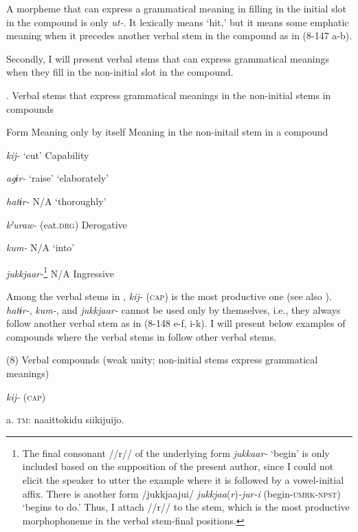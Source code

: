 A morpheme that can express a grammatical meaning in filling in the initial slot in the compound is only \textit{ut-}. It lexically means ‘hit,’ but it means some emphatic meaning when it precedes another verbal stem in the compound as in (8-147 a-b).

  Secondly, I will present verbal stems that can express grammatical meanings when they fill in the non-initial slot in the compound.

\begin{styleBeschriftung}
\textmd{}\textmd{. Verbal stems that express grammatical meanings in the non-initial stems in} \textmd{compounds}
\end{styleBeschriftung}

Form    Meaning only by itself    Meaning in the non-initail stem in a compound

\textit{kij-}    ‘cut’    Capability

\textit{agɨr-}    ‘raise’    ‘elaborately’

\textit{hatɨr-}    N/A    ‘thoroughly’

\textit{kˀuraw-}    (eat.\textsc{drg})    Derogative

\textit{kum-}    N/A    ‘into’

\textit{jukkjaar-}\footnote{The final consonant //r// of the underlying form \textit{jukkaar-} ‘begin’ is only included based on the supposition of the present author, since I could not elicit the speaker to utter the example where it is followed by a vowel-initial affix. There is another form /jukkjaajui/ \textit{jukkjaa}(\textit{r})\textit{{}-jur-i} (begin-\textsc{umrk}-\textsc{npst}) ‘begins to do.’ Thus, I attach //r// to the stem, which is the most productive morphophoneme in the verbal stem-final positions.}    N/A    Ingressive

Among the verbal stems in , \textit{kij-} (\textsc{cap}) is the most productive one (see also ). \textit{hatɨr-}, \textit{kum-}, and \textit{jukkjaar-} cannot be used only by themselves, i.e., they always follow another verbal stem as in (8-148 e-f, i-k). I will present below examples of compounds where the verbal stems in  follow other verbal stems.

(8)  Verbal compounds (weak unity; non-initial stems express grammatical meanings)

  \textit{kij-} (\textsc{cap})

  a.  \textsc{tm}:  naa{\textbar}ittoki{\textbar}du  siikijuijo.

